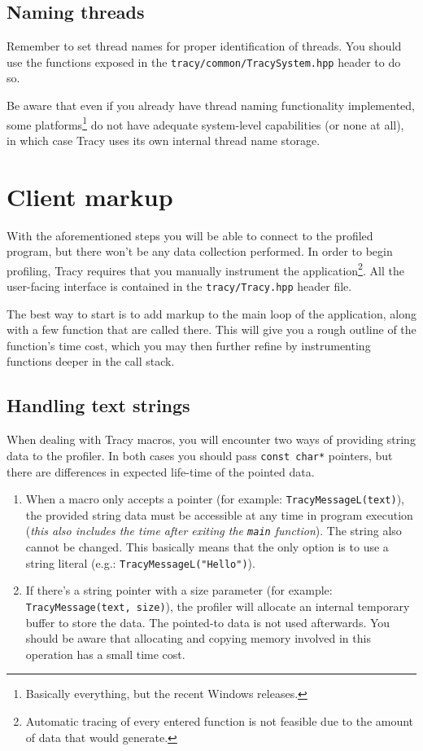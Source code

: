 \documentclass[hidelinks,titlepage,a4paper]{article}
\begin{document}
\subsection{Naming threads}

Remember to set thread names for proper identification of threads. You should use the functions exposed in the \texttt{tracy/common/TracySystem.hpp} header to do so.

Be aware that even if you already have thread naming functionality implemented, some platforms\footnote{Basically everything, but the recent Windows releases.} do not have adequate system-level capabilities (or none at all), in which case Tracy uses its own internal thread name storage.

\section{Client markup}
\label{client}

With the aforementioned steps you will be able to connect to the profiled program, but there won't be any data collection performed. In order to begin profiling, Tracy requires that you manually instrument the application\footnote{Automatic tracing of every entered function is not feasible due to the amount of data that would generate.}. All the user-facing interface is contained in the \texttt{tracy/Tracy.hpp} header file.

The best way to start is to add markup to the main loop of the application, along with a few function that are called there. This will give you a rough outline of the function's time cost, which you may then further refine by instrumenting functions deeper in the call stack.

\subsection{Handling text strings}

When dealing with Tracy macros, you will encounter two ways of providing string data to the profiler. In both cases you should pass \texttt{const char*} pointers, but there are differences in expected life-time of the pointed data.

\begin{enumerate}
\item When a macro only accepts a pointer (for example: \texttt{TracyMessageL(text)}), the provided string data must be accessible at any time in program execution (\emph{this also includes the time after exiting the \texttt{main} function}). The string also cannot be changed. This basically means that the only option is to use a string literal (e.g.: \texttt{TracyMessageL("Hello")}).

\item If there's a string pointer with a size parameter (for example: \texttt{TracyMessage(text, size)}), the profiler will allocate an internal temporary buffer to store the data. The pointed-to data is not used afterwards. You should be aware that allocating and copying memory involved in this operation has a small time cost.
\end{enumerate}
\end{document}
